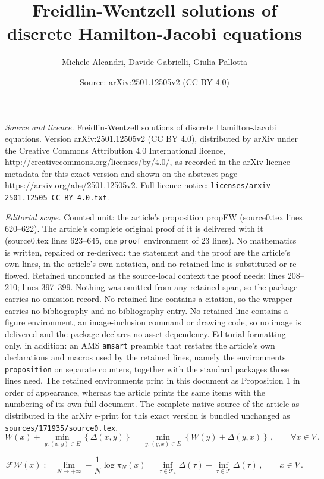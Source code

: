 \documentclass[10pt,a4paper]{amsart}
\title{Freidlin-Wentzell solutions of discrete Hamilton-Jacobi equations}
\author{Michele Aleandri, Davide Gabrielli, Giulia Pallotta}
\date{Source: arXiv:2501.12505v2 (CC BY 4.0)}
\begin{document}
\maketitle

\noindent\emph{Source and licence.} Freidlin-Wentzell solutions of discrete Hamilton-Jacobi equations. Version arXiv:2501.12505v2 (CC BY 4.0), distributed by arXiv under the Creative Commons Attribution 4.0 International licence, http://creativecommons.org/licenses/by/4.0/, as recorded in the arXiv licence metadata for this exact version and shown on the abstract page https://arxiv.org/abs/2501.12505v2. Full licence notice: \texttt{licenses/arxiv-2501.12505-CC-BY-4.0.txt}.\par\smallskip

\noindent\textit{Editorial scope.} Counted unit: the article's proposition propFW (source0.tex lines 620--622). The article's complete original proof of it is delivered with it (source0.tex lines 623--645, one \texttt{proof} environment of 23 lines). No mathematics is written, repaired or re-derived: the statement and the proof are the article's own lines, in the article's own notation, and no retained line is substituted or re-flowed.  Retained uncounted as the source-local context the proof needs: lines 208--210; lines 397--399.  Nothing was omitted from any retained span, so the package carries no omission record.  No retained line contains a citation, so the wrapper carries no bibliography and no bibliography entry.  No retained line contains a figure environment, an image-inclusion command or drawing code, so no image is delivered and the package declares no asset dependency.  Editorial formatting only, in addition: an AMS \texttt{amsart} preamble that restates the article's own declarations and macros used by the retained lines, namely the environments \texttt{proposition} on separate counters, together with the standard packages those lines need.  The retained environments print in this document as Proposition 1 in order of appearance, whereas the article prints the same items with the numbering of its own full document.  The complete native source of the article as distributed in the arXiv e-print for this exact version is bundled unchanged as \texttt{sources/171935/source0.tex}.
	\begin{equation}\label{1HJ}
		W(x)+\min_{y:(x,y)\in E}\left\{\Delta(x,y)\right\}=\min_{y:(y,x)\in E}\left\{W(y)+\Delta(y,x)\right\}\,,\qquad \forall x\in V\,.
	\end{equation}

	\begin{equation} \label{FW solution}
		\mathscr{FW}(x):=\lim_{N\to +\infty}-\frac 1N\log \pi_N(x)=\inf_{\tau\in \mathcal T_x} \Delta(\tau)-\inf_{\tau\in \mathcal T} \Delta(\tau)\,, \qquad x\in V\,.
	\end{equation}
\end{document}
